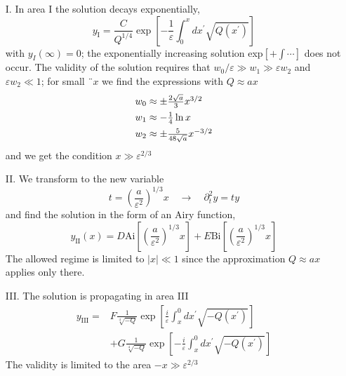 \begin{enumerate}
    \item[I.] In area I the solution decays exponentially,
    \begin{equation}
        y_{\mathrm{I}}=\frac{C}{Q^{1 / 4}} \exp \left[-\frac{1}{\varepsilon} \int_{0}^{x} d x^{\prime} \sqrt{Q\left(x^{\prime}\right)}\right]
        \end{equation}
    with $y_I (\infty) = 0$; the exponentially increasing solution exp$ [+ \int \cdots]$ does not occur. The validity of the solution requires that $w_0 / \varepsilon \gg w_1 \gg \varepsilon w_2$ and $\varepsilon w_2\ll 1$; for small $¨ x$ we ​​find the expressions with $Q \approx ax$
    \begin{equation}
        \begin{array}{l}
        {w_{0} \approx \pm \frac{2 \sqrt{a}}{3} x^{3 / 2}}\vspace{1ex}\\{w_{1} \approx-\frac{1}{4} \ln x} \vspace{1ex}\\ {w_{2} \approx \pm \frac{5}{48 \sqrt{a}} x^{-3 / 2}}\end{array}
        \end{equation}
    and we get the condition $x \gg \varepsilon^{2 / 3}$
    \item[II.] We transform to the new variable
    \begin{equation}
        t=\left(\frac{a}{\varepsilon^{2}}\right)^{1 / 3} x \quad \rightarrow \quad \partial_{t}^{2} y=t y
        \end{equation}
    and find the solution in the form of an Airy function,
    \begin{equation}
        y_{\mathrm{II}}(x)=D \mathrm{Ai}\left[\left(\frac{a}{\varepsilon^{2}}\right)^{1 / 3} x\right]+E \mathrm{Bi}\left[\left(\frac{a}{\varepsilon^{2}}\right)^{1 / 3} x\right]
        \end{equation}
    The allowed regime is limited to $| x |\ll 1$ since the approximation $Q \approx ax$ applies only there.
    \item[III.] The solution is propagating in area III
    \begin{equation}
    \begin{aligned} y_{\mathrm{III}}=& F \frac{1}{\sqrt[4]{-Q}} \exp \left[\frac{i}{\varepsilon} \int_{x}^{0} d x^{\prime} \sqrt{-Q\left(x^{\prime}\right)}\right] \\ &+G \frac{1}{\sqrt[4]{-Q}} \exp \left[-\frac{i}{\varepsilon} \int_{x}^{0} d x^{\prime} \sqrt{-Q\left(x^{\prime}\right)}\right] \end{aligned}
    \end{equation}
    The validity is limited to the area $-x\gg \varepsilon^{2 / 3}$
\end{enumerate}
